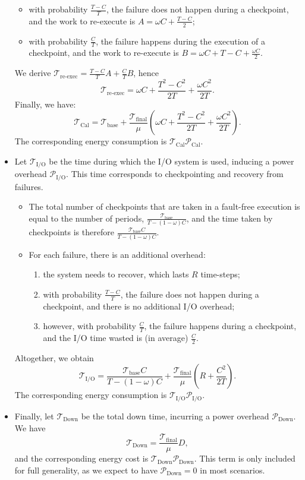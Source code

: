 \documentclass[a4paper]{article}
\newcommand{\ema}[1]{\ensuremath{#1}\xspace}
\newcommand{\ccc}{\ema{C}}
\newcommand{\rrr}{\ema{R}}
\newcommand{\ddd}{\ema{D}}
\newcommand{\period}{T}
\renewcommand{\time}[1][]{\ema{\mathcal{T}_{\text{#1}}}}
\newcommand{\tbase}{\time[base]}
\newcommand{\tfin}{\time[final]}
\newcommand{\tCal}{\time[Cal]}
\newcommand{\tIO}{\time[I/O]}
\newcommand{\tDown}{\time[Down]}
\newcommand{\twork}{\time[re-exec]}
\newcommand{\power}[1][]{\ema{\mathcal{P}_{\text{#1}}}}
\newcommand{\pCal}{\power[Cal]}
\newcommand{\pIO}{\power[I/O]}
\newcommand{\pDown}{\power[Down]}
\newcommand{\workduringckpt}{\omega}
\begin{document}
\begin{itemize}
		 \begin{itemize}
			\item with probability $\frac{\period - \ccc}{\period}$, the failure does not happen
		during a checkpoint, and  the work to re-execute is
		 $A = \workduringckpt \ccc + \frac{\period - \ccc}{2}$; 
			\item with probability $\frac{\ccc}{\period}$, the failure happens during the
		execution of a checkpoint, and the work to re-execute is
		 $B = \workduringckpt \ccc + \period - \ccc + \frac{\workduringckpt \ccc}{2}$.
		\end{itemize}
		\smallskip
		We derive $\twork = \frac{\period - \ccc}{\period} A + \frac{\ccc}{\period} B$, hence\\[-.2cm]
		$$\twork =  \workduringckpt \ccc + \frac{\period^2 - \ccc^2}{2\period} + \frac{\workduringckpt \ccc^2}{2\period}.$$
Finally, we have: 
\[ \tCal = \tbase + \frac{\tfin}{\mu}\left ( \workduringckpt \ccc + \frac{\period^2 - \ccc^2}{2\period} + \frac{\workduringckpt \ccc^2}{2\period}\right ) . \]
The corresponding energy consumption is $\tCal \pCal$.
\smallskip
	\item Let \tIO be the time during which the I/O system is used,  inducing a power overhead \pIO. This time corresponds to
checkpointing and recovery from failures. 
	\begin{itemize}
		\item The total number of checkpoints that are taken in a fault-free execution  is equal 
		to the number of periods, 
	$\frac{\tbase}{\period - (1-\workduringckpt)\ccc}$, and the time taken by checkpoints
	is therefore $\frac{\tbase C}{\period - (1-\workduringckpt)\ccc}$. 
	\smallskip
		\item For each failure, there is an additional overhead:
		\begin{enumerate}
			\item the system needs to recover, which lasts \rrr time-steps;
			\item with probability $\frac{\period - \ccc}{\period}$, the failure does not happen
		during a checkpoint, and there is no additional I/O overhead;
			\item however, with probability $\frac{\ccc}{\period}$, the failure happens during a 
		checkpoint, and the I/O time wasted is (in average)  $\frac{\ccc}{2}$.
		\end{enumerate}
	\end{itemize}
Altogether, we obtain
\[\tIO = \frac{\tbase \ccc}{\period - (1-\workduringckpt)\ccc} + \frac{\tfin}{\mu}\left ( \rrr + \frac{\ccc^2}{2\period}\right ) .  \]
The corresponding energy consumption is $\tIO \pIO$.
\smallskip
	\item  Finally, let \tDown be the total down time, incurring a power overhead \pDown.
	We have 
\[\tDown = \frac{\tfin}{\mu}\ddd ,\]
and the corresponding energy cost is $\tDown \pDown$. This term is only included for full generality, as 
we expect to have $\pDown=0$ in most scenarios.
\end{itemize}
\end{document}
